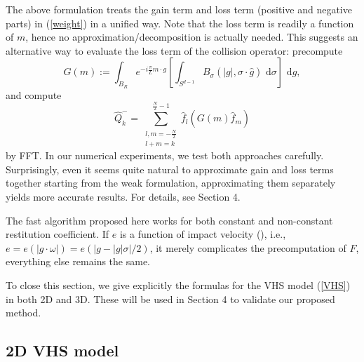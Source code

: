 \documentclass[review,times]{elsarticle}
\newcommand{\rd}{\,\mathrm{d}}
\begin{document}
The above formulation treats the gain term and loss term (positive and negative parts) in (\ref{weight}) in a unified way. Note that the loss term is readily a function of $m$, hence no approximation/decomposition is actually needed. This suggests an alternative way to evaluate the loss term of the collision operator: precompute
\begin{equation}
G(m):=\int_{B_R}e^{-i\frac{\pi}{L}m \cdot g}\left[\int_{S^{d-1}}B_{\sigma}(|g|,\sigma\cdot \hat{g})\,\rd{\sigma}\right]\,\rd{g},
\end{equation}
and compute
\begin{equation}
\hat{Q}^-_k=\sum_{\substack{l,m=-\frac{N}{2}\\l+m=k}}^{\frac{N}{2}-1}\hat{f}_l\left(G(m)\hat{f}_m\right)
\end{equation}
by FFT. In our numerical experiments, we test both approaches carefully. Surprisingly, even it seems quite natural to approximate gain and loss terms together starting from the weak formulation, approximating them separately yields more accurate results. For details, see Section 4.

\begin{rmk}
The fast algorithm proposed here works for both constant and non-constant restitution coefficient. If $e$ is a function of impact velocity (\cite{BP}), i.e., $e=e(|g\cdot \omega|)=e(|g-|g|\sigma|/2)$, it merely complicates the precomputation of $F$, everything else remains the same.
\end{rmk}

To close this section, we give explicitly the formulas for the VHS model (\ref{VHS}) in both 2D and 3D. These will be used in Section 4 to validate our proposed method. 

\subsection{2D VHS model}
\end{document}
